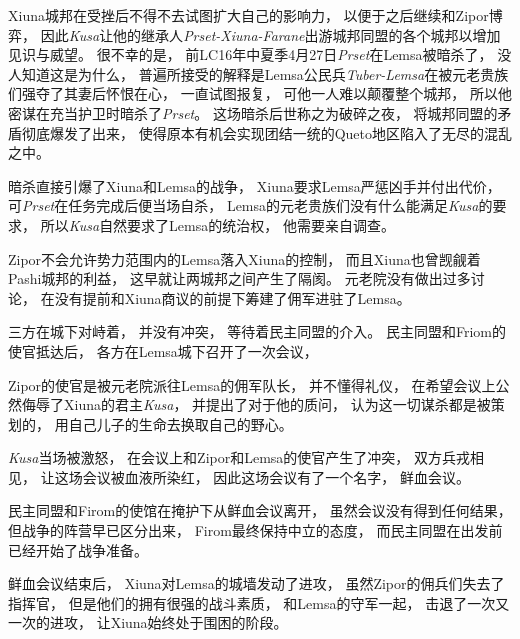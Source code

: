 \documentclass[UTF8,12pt]{ctexbook}
\begin{document}
            Xiuna城邦在受挫后不得不去试图扩大自己的影响力，
            以便于之后继续和Zipor博弈，
            因此\emph{Kusa}让他的继承人\emph{Prset-Xiuna-Farane}出游城邦同盟的各个城邦以增加见识与威望。
            很不幸的是，
            前LC16年中夏季4月27日\emph{Prset}在Lemsa被暗杀了，
            没人知道这是为什么，
            普遍所接受的解释是Lemsa公民兵\emph{Tuber-Lemsa}在被元老贵族们强夺了其妻后怀恨在心，
            一直试图报复，
            可他一人难以颠覆整个城邦，
            所以他密谋在充当护卫时暗杀了\emph{Prset}。
            这场暗杀后世称之为破碎之夜，
            将城邦同盟的矛盾彻底爆发了出来，
            使得原本有机会实现团结一统的Queto地区陷入了无尽的混乱之中。


            暗杀直接引爆了Xiuna和Lemsa的战争，
            Xiuna要求Lemsa严惩凶手并付出代价，
            可\emph{Prset}在任务完成后便当场自杀，
            Lemsa的元老贵族们没有什么能满足\emph{Kusa}的要求，
            所以\emph{Kusa}自然要求了Lemsa的统治权，
            他需要亲自调查。

            Zipor不会允许势力范围内的Lemsa落入Xiuna的控制，
            而且Xiuna也曾觊觎着Pashi城邦的利益，
            这早就让两城邦之间产生了隔阂。
            元老院没有做出过多讨论，
            在没有提前和Xiuna商议的前提下筹建了佣军进驻了Lemsa。

            三方在城下对峙着，
            并没有冲突，
            等待着民主同盟的介入。
            民主同盟和Friom的使官抵达后，
            各方在Lemsa城下召开了一次会议，

            Zipor的使官是被元老院派往Lemsa的佣军队长，
            并不懂得礼仪，
            在希望会议上公然侮辱了Xiuna的君主\emph{Kusa}，
            并提出了对于他的质问，
            认为这一切谋杀都是被策划的，
            用自己儿子的生命去换取自己的野心。

            \emph{Kusa}当场被激怒，
            在会议上和Zipor和Lemsa的使官产生了冲突，
            双方兵戎相见，
            让这场会议被血液所染红，
            因此这场会议有了一个名字，
            鲜血会议。

            民主同盟和Firom的使馆在掩护下从鲜血会议离开，
            虽然会议没有得到任何结果，
            但战争的阵营早已区分出来，
            Firom最终保持中立的态度，
            而民主同盟在出发前已经开始了战争准备。

            鲜血会议结束后，
            Xiuna对Lemsa的城墙发动了进攻，
            虽然Zipor的佣兵们失去了指挥官，
            但是他们的拥有很强的战斗素质，
            和Lemsa的守军一起，
            击退了一次又一次的进攻，
            让Xiuna始终处于围困的阶段。
\end{document}
